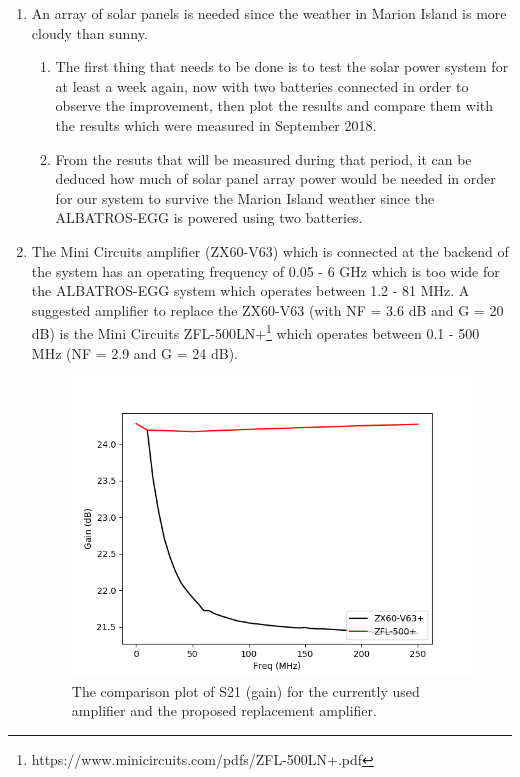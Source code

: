 \documentclass[12pt,a4paper]{report}
\begin{document}
\begin{enumerate}
	\item An array of solar panels is needed since the weather in Marion Island is more cloudy than sunny.
	
	\begin{enumerate}
		\item The first thing that needs to be done is to test the solar power system for at least a week again, now with two batteries connected in order to observe the improvement, then plot the results and compare them with the results which were measured in September 2018.
		
		\item From the resuts that will be measured during that period, it can be deduced how much of solar panel array power would be needed in order for our system to survive the Marion Island weather since the ALBATROS-EGG is powered using two batteries.
	\end{enumerate}
	
\item The Mini Circuits amplifier (ZX60-V63) which is connected at the backend of the system has an operating frequency of 0.05 - 6 GHz which is too wide for the ALBATROS-EGG system which operates between 1.2 - 81 MHz. A suggested amplifier to replace the ZX60-V63 (with NF = 3.6 dB and G = 20 dB) is the Mini Circuits ZFL-500LN+\footnote{https://www.minicircuits.com/pdfs/ZFL-500LN+.pdf} which operates between 0.1 - 500 MHz (NF = 2.9 and G = 24 dB). 

\begin{figure}[ht!]
	\begin{center}
		\includegraphics[width=0.8\linewidth]{Figures/foo.png}
		\caption{The comparison plot of S21 (gain) for the currently used amplifier and the proposed replacement amplifier.}
		\label{Fig:foo}
	\end{center}
\end{figure}


\end{enumerate}
\end{document}
